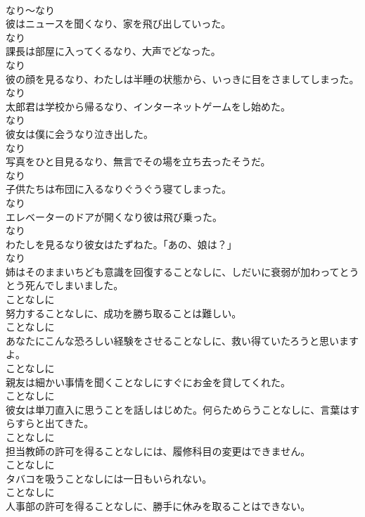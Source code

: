 \documentclass[8pt]{extreport}
\begin{document}
\begin{CJK}{UTF8}{min}
\\	なり～なり
\\	彼はニュースを聞くなり、家を飛び出していった。	
\\	なり
\\	課長は部屋に入ってくるなり、大声でどなった。	
\\	なり
\\	彼の顔を見るなり、わたしは半睡の状態から、いっきに目をさましてしまった。	
\\	なり
\\	太郎君は学校から帰るなり、インターネットゲームをし始めた。	
\\	なり
\\	彼女は僕に会うなり泣き出した。	
\\	なり
\\	写真をひと目見るなり、無言でその場を立ち去ったそうだ。	
\\	なり
\\	子供たちは布団に入るなりぐうぐう寝てしまった。	
\\	なり
\\	エレベーターのドアが開くなり彼は飛び乗った。	
\\	なり
\\	わたしを見るなり彼女はたずねた。「あの、娘は？」	
\\	なり
\\	姉はそのままいちども意識を回復することなしに、しだいに衰弱が加わってとうとう死んでしまいました。	
\\	ことなしに
\\	努力することなしに、成功を勝ち取ることは難しい。	
\\	ことなしに
\\	あなたにこんな恐ろしい経験をさせることなしに、救い得ていたろうと思いますよ。	
\\	ことなしに
\\	親友は細かい事情を聞くことなしにすぐにお金を貸してくれた。	
\\	ことなしに
\\	彼女は単刀直入に思うことを話しはじめた。何らためらうことなしに、言葉はすらすらと出てきた。	
\\	ことなしに
\\	担当教師の許可を得ることなしには、履修科目の変更はできません。	
\\	ことなしに
\\	タバコを吸うことなしには一日もいられない。	
\\	ことなしに
\\	人事部の許可を得ることなしに、勝手に休みを取ることはできない。	

\end{CJK}
\end{document}
